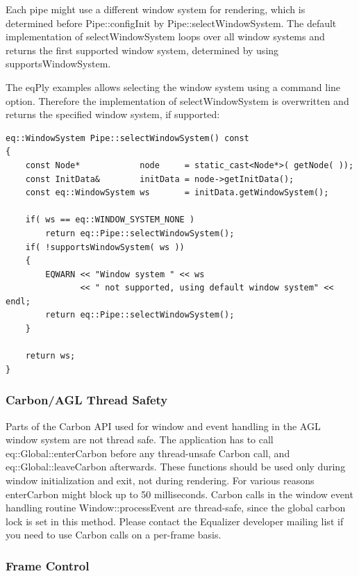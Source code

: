 \documentclass[10pt,a4]{scrartcl}
\begin{document}
Each pipe might use a different window system for rendering, which is
determined before \textsf{Pipe::configInit} by
\textsf{Pipe::selectWindowSystem}. The default implementation of
\textsf{selectWindowSystem} loops over all window systems and returns
the first supported window system, determined by using
\textsf{supportsWindowSystem}.

The \textsf{eqPly} examples allows selecting the window system using a
command line option. Therefore the implementation of
\textsf{selectWindowSystem} is overwritten and returns the specified
window system, if supported:

{\footnotesize\begin{lstlisting}
eq::WindowSystem Pipe::selectWindowSystem() const
{
    const Node*            node     = static_cast<Node*>( getNode( ));
    const InitData&        initData = node->getInitData();
    const eq::WindowSystem ws       = initData.getWindowSystem();

    if( ws == eq::WINDOW_SYSTEM_NONE )
        return eq::Pipe::selectWindowSystem();
    if( !supportsWindowSystem( ws ))
    {
        EQWARN << "Window system " << ws 
               << " not supported, using default window system" << endl;
        return eq::Pipe::selectWindowSystem();
    }

    return ws;
}
\end{lstlisting}}%

\subsubsection{Carbon/AGL Thread Safety}

Parts of the Carbon API used for window and event handling in the AGL
window system are not thread safe. The application has to call
\textsf{eq::Global::enterCarbon} before any thread-unsafe Carbon call,
and \textsf{eq::Global::leaveCarbon} afterwards. These functions should
be used only during window initialization and exit, not during
rendering. For various reasons \textsf{enterCarbon} might block up to 50
milliseconds. Carbon calls in the window event handling routine
\textsf{Window::processEvent} are thread-safe, since the global carbon
lock is set in this method. Please contact the Equalizer developer
mailing list if you need to use Carbon calls on a per-frame basis.

\subsubsection{Frame Control}
\end{document}
